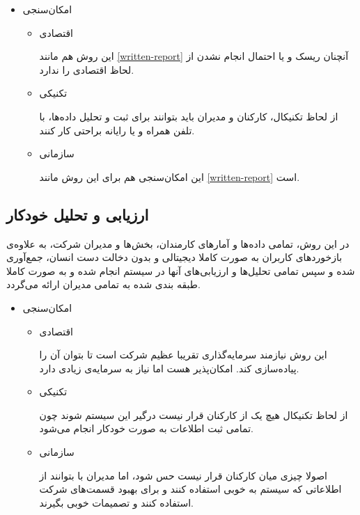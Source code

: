 \documentclass[12pt, dvipsnames, svgnames, x11names,]{article}
\begin{document}
\begin{itemize}
    \item امکان‌سنجی
    
    \begin{itemize}
        \item 
        اقتصادی
        
           این روش هم مانند \ref{written-report} آنچنان ریسک و یا احتمال انجام نشدن از لحاظ اقتصادی را ندارد.
        \item 
        تکنیکی
        
        از لحاظ تکنیکال، کارکنان و مدیران باید بتوانند برای ثبت و تحلیل داده‌ها، با تلفن همراه و یا رایانه براحتی کار کنند.
        \item 
        سازمانی
        
        این امکان‌سنجی هم برای این روش مانند \ref{written-report} است.
        
    \end{itemize}
\end{itemize}

\subsection{ارزیابی و تحلیل خودکار }\label{full-digital}
در این روش، تمامی داده‌ها و آمار‌های کارمندان، بخش‌ها و مدیران شرکت، به علاوه‌ی بازخورد‌های کاربران به صورت کاملا دیجیتالی و بدون دخالت دست انسان، جمع‌آوری شده و سپس تمامی تحلیل‌ها و ارزیابی‌های آنها در سیستم  انجام شده و به صورت کاملا طبقه بندی شده به تمامی مدیران ارائه می‌گردد.

\begin{itemize}
    \item امکان‌سنجی
    
    \begin{itemize}
        \item 
        اقتصادی
        
        این روش نیازمند سرمایه‌گذاری تقریبا عظیم شرکت  است تا بتوان آن را پیاده‌سازی کند. امکان‌پذیر هست اما نیاز به سرمایه‌ی زیادی دارد.
        \item 
        تکنیکی
        
        از لحاظ تکنیکال هیچ یک از کارکنان قرار نیست درگیر این سیستم شوند چون تمامی ثبت اطلاعات به صورت خودکار انجام می‌شود.
        \item 
        سازمانی
        
        اصولا چیزی میان کارکنان قرار نیست حس شود، اما مدیران با بتوانند از اطلاعاتی که سیستم  به خوبی استفاده کنند و برای بهبود قسمت‌های شرکت استفاده کنند و تصمیمات خوبی بگیرند.
    \end{itemize}
\end{itemize}
\end{document}
